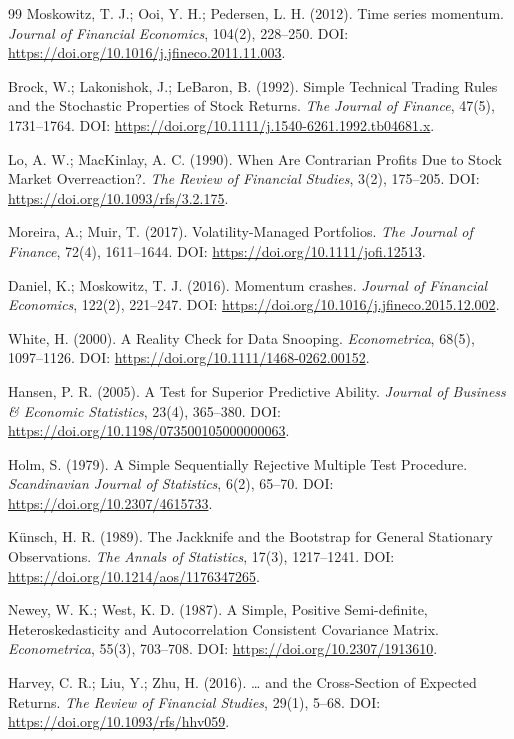 \documentclass[11pt,a4paper]{article}
\begin{document}
\begin{thebibliography}{99}
\small{}
 Moskowitz, T. J.; Ooi, Y. H.; Pedersen, L. H. (2012). Time series momentum. \emph{Journal of Financial Economics}, 104(2), 228–250. DOI: \url{https://doi.org/10.1016/j.jfineco.2011.11.003}.

 Brock, W.; Lakonishok, J.; LeBaron, B. (1992). Simple Technical Trading Rules and the Stochastic Properties of Stock Returns. \emph{The Journal of Finance}, 47(5), 1731–1764. DOI: \url{https://doi.org/10.1111/j.1540-6261.1992.tb04681.x}.

 Lo, A. W.; MacKinlay, A. C. (1990). When Are Contrarian Profits Due to Stock Market Overreaction?. \emph{The Review of Financial Studies}, 3(2), 175–205. DOI: \url{https://doi.org/10.1093/rfs/3.2.175}.

 Moreira, A.; Muir, T. (2017). Volatility-Managed Portfolios. \emph{The Journal of Finance}, 72(4), 1611–1644. DOI: \url{https://doi.org/10.1111/jofi.12513}.

 Daniel, K.; Moskowitz, T. J. (2016). Momentum crashes. \emph{Journal of Financial Economics}, 122(2), 221–247. DOI: \url{https://doi.org/10.1016/j.jfineco.2015.12.002}.

 White, H. (2000). A Reality Check for Data Snooping. \emph{Econometrica}, 68(5), 1097–1126. DOI: \url{https://doi.org/10.1111/1468-0262.00152}.

 Hansen, P. R. (2005). A Test for Superior Predictive Ability. \emph{Journal of Business \& Economic Statistics}, 23(4), 365–380. DOI: \url{https://doi.org/10.1198/073500105000000063}.

 Holm, S. (1979). A Simple Sequentially Rejective Multiple Test Procedure. \emph{Scandinavian Journal of Statistics}, 6(2), 65–70. DOI: \url{https://doi.org/10.2307/4615733}.

 Künsch, H. R. (1989). The Jackknife and the Bootstrap for General Stationary Observations. \emph{The Annals of Statistics}, 17(3), 1217–1241. DOI: \url{https://doi.org/10.1214/aos/1176347265}.

 Newey, W. K.; West, K. D. (1987). A Simple, Positive Semi-definite, Heteroskedasticity and Autocorrelation Consistent Covariance Matrix. \emph{Econometrica}, 55(3), 703–708. DOI: \url{https://doi.org/10.2307/1913610}.

 Harvey, C. R.; Liu, Y.; Zhu, H. (2016). … and the Cross-Section of Expected Returns. \emph{The Review of Financial Studies}, 29(1), 5–68. DOI: \url{https://doi.org/10.1093/rfs/hhv059}.
\end{thebibliography}
\end{document}
